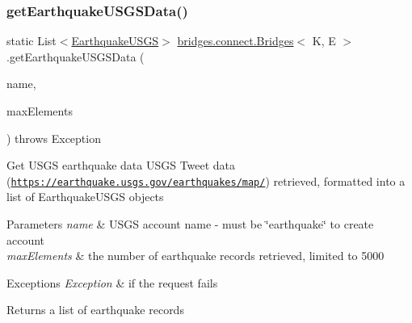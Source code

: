 \hypertarget{classbridges_1_1connect_1_1_bridges_afd68bf25a3f61e731f603da67fbdcecc}{}\label{classbridges_1_1connect_1_1_bridges_afd68bf25a3f61e731f603da67fbdcecc} 
\subsubsection{\texorpdfstring{get\+Earthquake\+U\+S\+G\+S\+Data()}{getEarthquakeUSGSData()}}
{\footnotesize\ttfamily static List$<$\hyperlink{classbridges_1_1data__src__dependent_1_1_earthquake_u_s_g_s}{Earthquake\+U\+S\+GS}$>$ \hyperlink{classbridges_1_1connect_1_1_bridges}{bridges.\+connect.\+Bridges}$<$ K, E $>$.get\+Earthquake\+U\+S\+G\+S\+Data (\begin{DoxyParamCaption}\item[{\hyperlink{classbridges_1_1data__src__dependent_1_1_u_s_g_saccount}{U\+S\+G\+Saccount}}]{name,  }\item[{int}]{max\+Elements }\end{DoxyParamCaption}) throws Exception\hspace{0.3cm}{\ttfamily [static]}}

Get U\+S\+GS earthquake data U\+S\+GS Tweet data (\href{https://earthquake.usgs.gov/earthquakes/map/}{\tt https\+://earthquake.\+usgs.\+gov/earthquakes/map/}) retrieved, formatted into a list of Earthquake\+U\+S\+GS objects


\begin{DoxyParams}{Parameters}
{\em name} & U\+S\+GS account name -\/ must be \char`\"{}earthquake\char`\"{} to create account \\
\hline
{\em max\+Elements} & the number of earthquake records retrieved, limited to 5000 \\
\hline
\end{DoxyParams}

\begin{DoxyExceptions}{Exceptions}
{\em Exception} & if the request fails\\
\hline
\end{DoxyExceptions}
\begin{DoxyReturn}{Returns}
a list of earthquake records 
\end{DoxyReturn}
\hypertarget{classbridges_1_1connect_1_1_bridges_abcd1c3465d8963cd635a63e248f33525}{}\label{classbridges_1_1connect_1_1_bridges_abcd1c3465d8963cd635a63e248f33525} 
